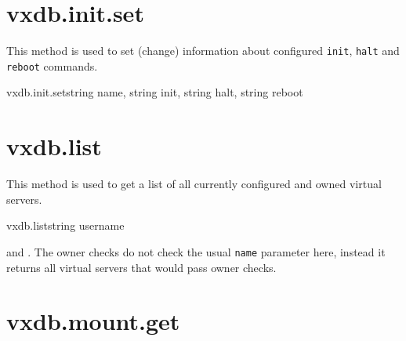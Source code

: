 \rpcnoerrors


\section{vxdb.init.set}

This method is used to set (change) information about configured \texttt{init},
\texttt{halt} and \texttt{reboot} commands.

\begin{rpcsynopsis}{vxdb.init.set}{string name, string init, string halt,
	string reboot}
\end{rpcsynopsis}

\rpcreturnnil

\rpcnoerrors


\section{vxdb.list}

This method is used to get a list of all currently configured and owned virtual
servers.

\begin{rpcsynopsis}{vxdb.list}{string username}
\end{rpcsynopsis}

\begin{rpcaccess}
\rpcnocapability and \rpcownerchecks. The owner checks do not check the usual
\texttt{name} parameter here, instead it returns all virtual servers that would
pass owner checks.
\end{rpcaccess}



\rpcnoerrors


\section{vxdb.mount.get}

